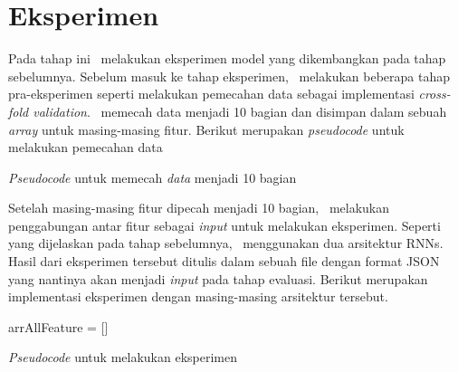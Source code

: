 \section{Eksperimen}
Pada tahap ini \saya~melakukan eksperimen model yang dikembangkan pada tahap sebelumnya. Sebelum masuk ke tahap eksperimen, \saya~melakukan beberapa tahap pra-eksperimen seperti melakukan pemecahan data sebagai implementasi \textit{cross-fold validation}. \Saya~memecah data menjadi 10 bagian dan disimpan dalam sebuah \textit{array} untuk masing-masing fitur. Berikut merupakan \textit{pseudocode} untuk melakukan pemecahan data

\begin{kode}

	
	
	\caption{\textit{Pseudocode} untuk memecah \textit{data} menjadi 10 bagian}	
	\label{code:split}
\end{kode}

Setelah masing-masing fitur dipecah menjadi 10 bagian, \saya~melakukan penggabungan antar fitur sebagai \textit{input} untuk melakukan eksperimen. Seperti yang dijelaskan pada tahap sebelumnya, \saya~menggunakan dua arsitektur RNNs. Hasil dari eksperimen tersebut ditulis dalam sebuah file dengan format JSON yang nantinya akan menjadi \textit{input} pada tahap evaluasi. Berikut merupakan implementasi eksperimen dengan masing-masing arsitektur tersebut.

\begin{kode}
	
	
	arrAllFeature = []\;
	\BlankLine
	
	\caption{\textit{Pseudocode} untuk melakukan eksperimen}
	\label{code:eksperimen}	
\end{kode}


